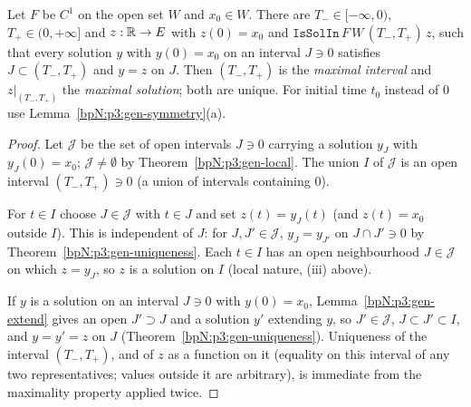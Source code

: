 \begin{theorem}\label{bpN:p3:gen-maximal}
Let $F$ be $C^1$ on the open set $W$ and $x_0\in W$. There are $T_-\in[-\infty,0)$, $T_+\in(0,+\infty]$ and
$z:\mathbb{R}\to E$ with $z(0)=x_0$ and $\texttt{IsSolIn}\,F\,W\,(T_-,T_+)\,z$, such that every solution $y$ with
$y(0)=x_0$ on an interval $J\ni0$ satisfies $J\subset(T_-,T_+)$ and $y=z$ on $J$. Then $(T_-,T_+)$ is the
\emph{maximal interval} and $z|_{(T_-,T_+)}$ the \emph{maximal solution}; both are unique. For initial time $t_0$
instead of $0$ use Lemma~\ref{bpN:p3:gen-symmetry}(a).
\end{theorem}
\begin{proof}
\label{stepN:p3:max-union} Let $\mathcal J$ be the set of open intervals $J\ni0$ carrying a solution $y_J$ with $y_J(0)=x_0$; $\mathcal J\ne\emptyset$ by Theorem~\ref{bpN:p3:gen-local}.
The union $I$ of $\mathcal J$ is an open interval $(T_-,T_+)\ni0$ (a union of intervals containing $0$).

\label{stepN:p3:max-glue} For $t\in I$ choose $J\in\mathcal J$ with $t\in J$ and set $z(t)=y_J(t)$ (and $z(t)=x_0$ outside $I$). This is independent of $J$: for $J,J'\in\mathcal J$, $y_J=y_{J'}$ on $J\cap J'\ni0$ by Theorem~\ref{bpN:p3:gen-uniqueness}.
Each $t\in I$ has an open neighbourhood $J\in\mathcal J$ on which $z=y_J$, so $z$ is a solution on $I$ (local nature, (iii) above).

\label{stepN:p3:max-max} If $y$ is a solution on an interval $J\ni0$ with $y(0)=x_0$, Lemma~\ref{bpN:p3:gen-extend} gives an open $J'\supset J$ and a solution $y'$ extending $y$, so $J'\in\mathcal J$, $J\subset J'\subset I$, and $y=y'=z$ on $J$ (Theorem~\ref{bpN:p3:gen-uniqueness}).
Uniqueness of the interval $(T_-,T_+)$, and of $z$ as a function on it (equality on this interval of any two representatives; values outside it are arbitrary), is immediate from the maximality property applied twice.
\end{proof}

